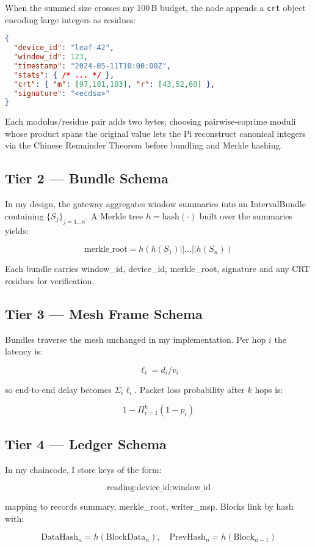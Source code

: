 \documentclass[12pt]{article}
\begin{document}
When the summed size crosses my 100 B budget, the node appends a \texttt{crt} object encoding large integers as residues:

\begin{lstlisting}[language=json, basicstyle=\footnotesize\ttfamily]
{
  "device_id": "leaf-42",
  "window_id": 123,
  "timestamp": "2024-05-11T10:00:00Z",
  "stats": { /* ... */ },
  "crt": { "m": [97,101,103], "r": [43,52,60] },
  "signature": "<ecdsa>"
}
\end{lstlisting}

Each modulus/residue pair adds two bytes; choosing pairwise-coprime moduli whose product spans the original value lets the Pi reconstruct canonical integers via the Chinese Remainder Theorem before bundling and Merkle hashing.

\subsection{Tier 2 — Bundle Schema}
In my design, the gateway aggregates window summaries into an IntervalBundle containing \(\{S_j\}_{j=1\ldots n}\). A Merkle tree \(h = \text{hash}(\cdot)\) built over the summaries yields:

\[
\text{merkle\_root} = h( h(S_1) || \ldots || h(S_n) )
\]

Each bundle carries window\_id, device\_id, merkle\_root, signature and any CRT residues for verification.

\subsection{Tier 3 — Mesh Frame Schema}
Bundles traverse the mesh unchanged in my implementation. Per hop \(i\) the latency is:

\[
\ell_i = d_i / v_i
\]

so end-to-end delay becomes \(\Sigma_i \ell_i\). Packet loss probability after \(k\) hops is:

\[
1 - \Pi_{i=1}^k (1 - p_i)
\]

\subsection{Tier 4 — Ledger Schema}
In my chaincode, I store keys of the form:

\[
\text{reading:device\_id:window\_id}
\]

mapping to records {summary, merkle\_root, writer\_msp}. Blocks link by hash with:

\[
\text{DataHash}_n = h(\text{BlockData}_n), \quad \text{PrevHash}_n = h(\text{Block}_{n-1})
\]
\end{document}
